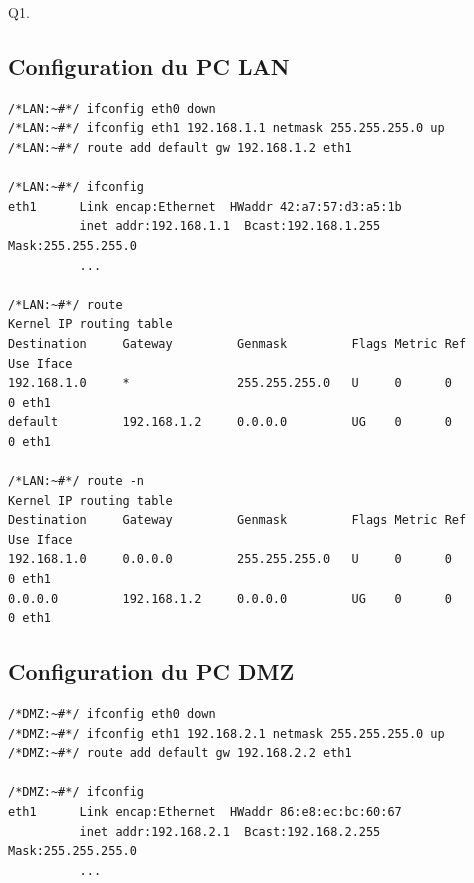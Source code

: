\documentclass[frenchb, 11pt]{article}
\newlength{\leftbarwidth}
\newlength{\leftbarsep}
\newcommand*{\leftbarcolorcmd}{\color{leftbarcolor}} %
\renewenvironment{leftbar}{%
    \def\FrameCommand{{\leftbarcolorcmd{\vrule width \leftbarwidth\relax\hspace {\leftbarsep}}}}%
    \MakeFramed {\advance \hsize -\width \FrameRestore }%
}{%
    \endMakeFramed
}
\begin{document}
\begin{leftbar}
\noindent Q1. %
\end{leftbar}

\subsection{Configuration du PC LAN}
\begin{lstlisting}
/*LAN:~#*/ ifconfig eth0 down
/*LAN:~#*/ ifconfig eth1 192.168.1.1 netmask 255.255.255.0 up
/*LAN:~#*/ route add default gw 192.168.1.2 eth1

/*LAN:~#*/ ifconfig
eth1      Link encap:Ethernet  HWaddr 42:a7:57:d3:a5:1b
          inet addr:192.168.1.1  Bcast:192.168.1.255  Mask:255.255.255.0
          ...

/*LAN:~#*/ route
Kernel IP routing table
Destination     Gateway         Genmask         Flags Metric Ref    Use Iface
192.168.1.0     *               255.255.255.0   U     0      0        0 eth1
default         192.168.1.2     0.0.0.0         UG    0      0        0 eth1

/*LAN:~#*/ route -n
Kernel IP routing table
Destination     Gateway         Genmask         Flags Metric Ref    Use Iface
192.168.1.0     0.0.0.0         255.255.255.0   U     0      0        0 eth1
0.0.0.0         192.168.1.2     0.0.0.0         UG    0      0        0 eth1
\end{lstlisting}

\subsection{Configuration du PC DMZ}
\begin{lstlisting}
/*DMZ:~#*/ ifconfig eth0 down
/*DMZ:~#*/ ifconfig eth1 192.168.2.1 netmask 255.255.255.0 up
/*DMZ:~#*/ route add default gw 192.168.2.2 eth1

/*DMZ:~#*/ ifconfig
eth1      Link encap:Ethernet  HWaddr 86:e8:ec:bc:60:67
          inet addr:192.168.2.1  Bcast:192.168.2.255  Mask:255.255.255.0
          ...
\end{lstlisting}
\newpage
\end{document}
